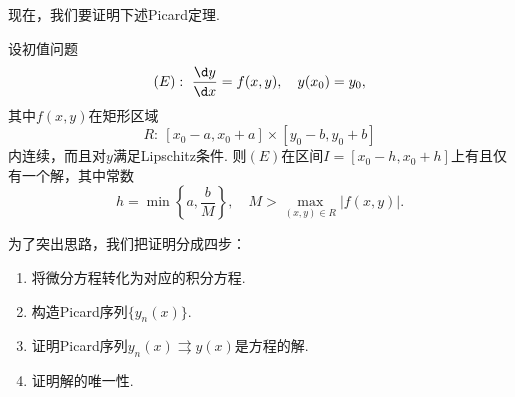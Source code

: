 \documentclass[lang=cn,10pt]{elegantbook}
\begin{document}
现在，我们要证明下述Picard定理.
\begin{theorem}[Picard定理]
	设初值问题
	$$(E):\ \frac{\d y}{\d x}=f(x,y),\quad y(x_0)=y_0,$$
	其中$f(x,y)$在矩形区域
	$$R:\ \left[x_0-a,x_0+a\right]\times\left[y_0-b,y_0+b\right]$$
	内连续，而且对$y$满足Lipschitz条件. 则$(E)$在区间$I=\left[x_0-h,x_0+h\right]$上有且仅有一个解，其中常数
	$$h=\min\left\{a,\frac{b}{M}\right\},\quad M>\max\limits_{(x,y)\in R}|f(x,y)|.$$
\end{theorem}
为了突出思路，我们把证明分成四步：
\begin{enumerate}[(1)]
	\item 将微分方程转化为对应的积分方程.
	\item 构造Picard序列$\{y_n(x)\}$.
	\item 证明Picard序列$y_n(x)\rightrightarrows y(x)$是方程的解.
	\item 证明解的唯一性.
\end{enumerate}
\end{document}
